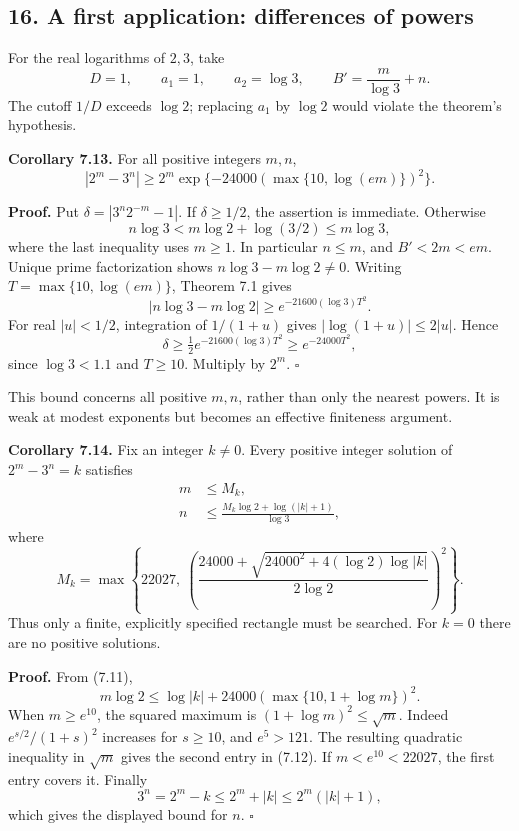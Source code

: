 \documentclass[
  11pt,
  a4paper,
]{article}
\begin{document}
\subsection{16. A first application: differences of
powers}\label{a-first-application-differences-of-powers}

For the real logarithms of \(2,3\), take \[
D=1,\qquad a_1=1,\qquad a_2=\log3,\qquad
B'=\frac m{\log3}+n.
\] The cutoff \(1/D\) exceeds \(\log2\); replacing \(a_1\) by \(\log2\)
would violate the theorem's hypothesis.

\textbf{Corollary 7.13.} For all positive integers \(m,n\), \[
|2^m-3^n|\ge
2^m\exp\{-24000(\max\{10,\log(em)\})^2\}. \tag{7.11}
\]

\textbf{Proof.} Put \(\delta=|3^n2^{-m}-1|\). If \(\delta\ge1/2\), the
assertion is immediate. Otherwise \[
n\log3<m\log2+\log(3/2)\le m\log3,
\] where the last inequality uses \(m\ge1\). In particular \(n\le m\),
and \(B'<2m<em\). Unique prime factorization shows
\(n\log3-m\log2\ne0\). Writing \(T=\max\{10,\log(em)\}\), Theorem 7.1
gives \[
|n\log3-m\log2|\ge e^{-21600(\log3)T^2}.
\] For real \(|u|<1/2\), integration of \(1/(1+u)\) gives
\(|\log(1+u)|\le2|u|\). Hence \[
\delta\ge\tfrac12e^{-21600(\log3)T^2}\ge e^{-24000T^2},
\] since \(\log3<1.1\) and \(T\ge10\). Multiply by \(2^m\). \(\square\)

This bound concerns all positive \(m,n\), rather than only the nearest
powers. It is weak at modest exponents but becomes an effective
finiteness argument.

\textbf{Corollary 7.14.} Fix an integer \(k\ne0\). Every positive
integer solution of \(2^m-3^n=k\) satisfies \[
\begin{aligned}
m&\le M_k,\\
n&\le\frac{M_k\log2+\log(|k|+1)}{\log3},
\end{aligned}
\] where \[
M_k=\max\left\{22027,\
\left(\frac{24000+\sqrt{24000^2+4(\log2)\log|k|}}{2\log2}\right)^2\right\}. \tag{7.12}
\] Thus only a finite, explicitly specified rectangle must be searched.
For \(k=0\) there are no positive solutions.

\textbf{Proof.} From (7.11), \[
m\log2\le\log|k|+24000(\max\{10,1+\log m\})^2.
\] When \(m\ge e^{10}\), the squared maximum is
\((1+\log m)^2\le\sqrt m\). Indeed \(e^{s/2}/(1+s)^2\) increases for
\(s\ge10\), and \(e^5>121\). The resulting quadratic inequality in
\(\sqrt m\) gives the second entry in (7.12). If \(m<e^{10}<22027\), the
first entry covers it. Finally \[
3^n=2^m-k\le2^m+|k|\le2^m(|k|+1),
\] which gives the displayed bound for \(n\). \(\square\)
\end{document}
